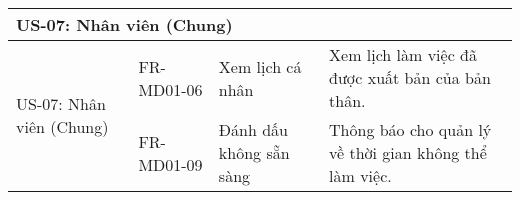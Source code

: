 \begin{longtable}{|m{2.5cm}|m{2.5cm}|m{5cm}|m{5cm}|}
	\multicolumn{4}{|l|}{\textbf{US-07: Nhân viên (Chung)}}                                                                                                                                                                                \\ \hline
	\multirow{2}{=}[2pt]{US-07: Nhân viên (Chung)}          & FR-MD01-06            & Xem lịch cá nhân                                       & Xem lịch làm việc đã được xuất bản của bản thân.                                            \\
	                                                        & FR-MD01-09            & Đánh dấu không sẵn sàng                                & Thông báo cho quản lý về thời gian không thể làm việc.                                      \\
	\hline


\end{longtable}
